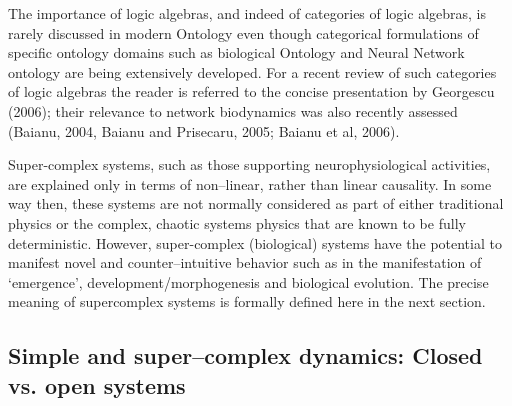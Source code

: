 \documentclass[12pt]{article}
\theoremstyle{plain}
\theoremstyle{definition}
\theoremstyle{plain}
\numberwithin{equation}{section}
\begin{document}
 The importance of logic algebras, and indeed of categories of logic algebras, is rarely discussed in modern Ontology even though categorical formulations of specific ontology domains such as biological Ontology and Neural Network ontology are being extensively developed. For a recent review of such categories of logic algebras the reader is referred to the concise presentation by Georgescu (2006); their relevance to network biodynamics was also recently assessed (Baianu, 2004, Baianu and Prisecaru, 2005; Baianu et al, 2006).  

 Super-complex systems, such as those supporting neurophysiological activities, are explained only in terms of non--linear, rather than linear causality. In some way then, these systems are not normally considered as
part of either traditional physics or the complex, chaotic systems physics
that are known to be fully deterministic. However, super-complex (biological) systems have the potential to manifest novel and counter--intuitive behavior such as in the manifestation of `emergence', development/morphogenesis and
biological evolution. The precise meaning of supercomplex systems is formally defined here
in the next section. 

\subsection{Simple and super--complex dynamics: Closed vs. open systems}
\end{document}
